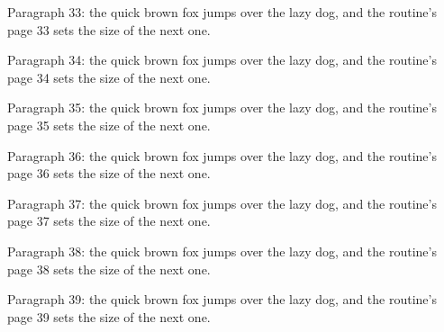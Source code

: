 Paragraph 33: the quick brown fox jumps over the lazy dog, and the routine's page 33 sets the size of the next one.\par
Paragraph 34: the quick brown fox jumps over the lazy dog, and the routine's page 34 sets the size of the next one.\par
Paragraph 35: the quick brown fox jumps over the lazy dog, and the routine's page 35 sets the size of the next one.\par
Paragraph 36: the quick brown fox jumps over the lazy dog, and the routine's page 36 sets the size of the next one.\par
Paragraph 37: the quick brown fox jumps over the lazy dog, and the routine's page 37 sets the size of the next one.\par
Paragraph 38: the quick brown fox jumps over the lazy dog, and the routine's page 38 sets the size of the next one.\par
Paragraph 39: the quick brown fox jumps over the lazy dog, and the routine's page 39 sets the size of the next one.\par
{}\bye
